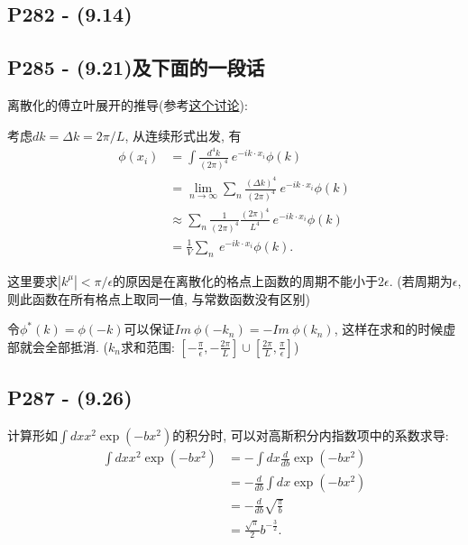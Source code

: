 \documentclass[10pt,b5paper,openany]{book}
\begin{document}
\subsection{P282 - (9.14)}

\begin{center}
\end{center}

\subsection{P285 - (9.21)及下面的一段话}

离散化的傅立叶展开的推导(参考\href{https://physics.stackexchange.com/questions/533991/the-discrete-fourier-series-in-peskin-and-schroeder-page-285}{这个讨论}): 

考虑$dk = \Delta k = 2\pi/L$, 从连续形式出发, 有
\begin{equation}
  \begin{aligned}
    \phi(x_i) &= \int \frac{d^4 k}{(2\pi)^4} \ e^{-ik\cdot x_i}\phi(k) \\ 
    &= \lim_{n\rightarrow\infty}\sum_n \frac{(\Delta k)^4}{(2\pi)^4} \ e^{-ik\cdot x_i}\phi(k) \\
    &\approx \sum_n \frac{1}{(2\pi)^4} \frac{(2\pi)^4}{L^4}\ e^{-ik\cdot x_i}\phi(k) \\ 
    &= \frac{1}{V} \sum_n \ e^{-ik\cdot x_i}\phi(k).
  \end{aligned}
\end{equation}

这里要求$|k^{\mu}| < \pi/\epsilon$的原因是在离散化的格点上函数的周期不能小于$2\epsilon$. (若周期为$\epsilon$, 则此函数在所有格点上取同一值, 与常数函数没有区别)

令$\phi^*(k) = \phi(-k)$可以保证$Im\ \phi(-k_n) = -Im\ \phi(k_n)$, 这样在求和的时候虚部就会全部抵消. ($k_n$求和范围: $[-\frac{\pi}{\epsilon}, -\frac{2\pi}{L}]\cup [\frac{2\pi}{L}, \frac{\pi}{\epsilon}]$)

\subsection{P287 - (9.26)}

计算形如$\int dx x^2 \exp(-bx^2)$的积分时, 可以对高斯积分内指数项中的系数求导: 
\begin{equation}
  \begin{aligned}
    \int dx x^2 \exp(-bx^2) &= -\int dx \frac{d}{db}\exp(-bx^2) \\
    &= -\frac{d}{db} \int dx \exp(-bx^2) \\ 
    &= -\frac{d}{db} \sqrt{\frac{\pi}{b}} \\ 
    &= \frac{\sqrt{\pi}}{2}b^{-\frac{3}{2}}. 
  \end{aligned}
\end{equation}
\end{document}
